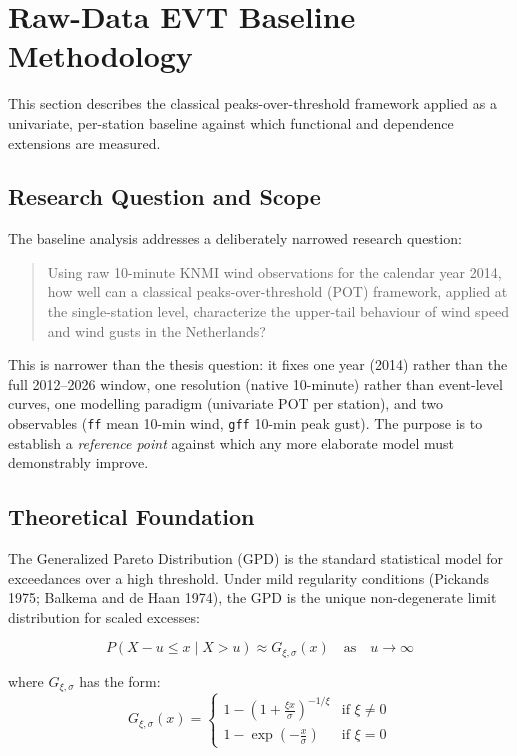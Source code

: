\section{Raw-Data EVT Baseline Methodology}
\label{sec:methodology_evt}

This section describes the classical peaks-over-threshold framework applied as a univariate, per-station baseline against which functional and dependence extensions are measured.

\subsection{Research Question and Scope}

The baseline analysis addresses a deliberately narrowed research question:
\begin{quote}
Using raw 10-minute KNMI wind observations for the calendar year 2014, how well can a classical peaks-over-threshold (POT) framework, applied at the single-station level, characterize the upper-tail behaviour of wind speed and wind gusts in the Netherlands?
\end{quote}

This is narrower than the thesis question: it fixes one year (2014) rather than the full 2012--2026 window, one resolution (native 10-minute) rather than event-level curves, one modelling paradigm (univariate POT per station), and two observables (\texttt{ff} mean 10-min wind, \texttt{gff} 10-min peak gust). The purpose is to establish a \emph{reference point} against which any more elaborate model must demonstrably improve.

\subsection{Theoretical Foundation}

The Generalized Pareto Distribution (GPD) is the standard statistical model for exceedances over a high threshold. Under mild regularity conditions (Pickands 1975; Balkema and de Haan 1974), the GPD is the unique non-degenerate limit distribution for scaled excesses:

\[
P(X - u \leq x \mid X > u) \approx G_{\xi, \sigma}(x) \quad \text{as} \quad u \to \infty
\]

where $G_{\xi, \sigma}$ has the form:
\[
G_{\xi, \sigma}(x) = \begin{cases}
1 - \left(1 + \frac{\xi x}{\sigma}\right)^{-1/\xi} & \text{if } \xi \neq 0 \\
1 - \exp\left(-\frac{x}{\sigma}\right) & \text{if } \xi = 0
\end{cases}
\]

